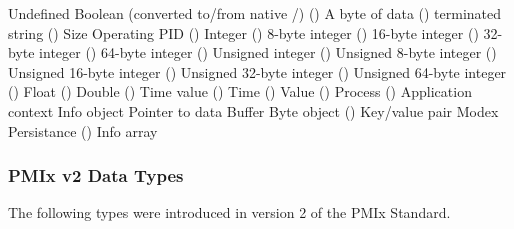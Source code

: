 \begin{constantdesc}
%
Undefined
%
Boolean (converted to/from native /) ()
%
A byte of data ()
%
 terminated string ()
%
Size 
%
Operating \ac{PID} ()
%
Integer ()
%
8-byte integer ()
%
16-byte integer ()
%
32-byte integer ()
%
64-byte integer ()
%
Unsigned integer ()
%
Unsigned 8-byte integer ()
%
Unsigned 16-byte integer ()
%
Unsigned 32-byte integer ()
%
Unsigned 64-byte integer ()
%
Float ()
%
Double ()
%
Time value ()
%
Time ()
%
Value ()
%
Process ()
%
Application context
%
Info object
%
Pointer to data
%
Buffer
%
Byte object ()
%
Key/value pair
%
Modex
%
Persistance ()
%
Info array
%
\end{constantdesc}


\subsubsection{PMIx v2 Data Types}
The following types were introduced in version 2 of the \ac{PMIx} Standard.

